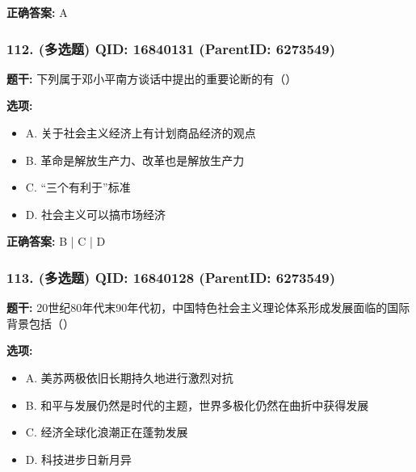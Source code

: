 \documentclass[12pt,UTF8]{ctexart}
\begin{document}
\textbf{正确答案:}
A

\vspace{0.3em}\hrulefill\vspace{0.7em}

\subsubsection*{112. (多选题) \small QID: 16840131 (ParentID: 6273549)}

\textbf{题干:}
下列属于邓小平南方谈话中提出的重要论断的有（）



\textbf{选项:}
\begin{itemize}[leftmargin=*]

  \item A. 关于社会主义经济上有计划商品经济的观点

  \item B. 革命是解放生产力、改革也是解放生产力

  \item C. “三个有利于”标准

  \item D. 社会主义可以搞市场经济

\end{itemize}

\textbf{正确答案:}
B | C | D

\vspace{0.3em}\hrulefill\vspace{0.7em}

\subsubsection*{113. (多选题) \small QID: 16840128 (ParentID: 6273549)}

\textbf{题干:}
20世纪80年代末90年代初，中国特色社会主义理论体系形成发展面临的国际背景包括（）



\textbf{选项:}
\begin{itemize}[leftmargin=*]

  \item A. 美苏两极依旧长期持久地进行激烈对抗

  \item B. 和平与发展仍然是时代的主题，世界多极化仍然在曲折中获得发展

  \item C. 经济全球化浪潮正在蓬勃发展

  \item D. 科技进步日新月异

\end{itemize}
\end{document}
